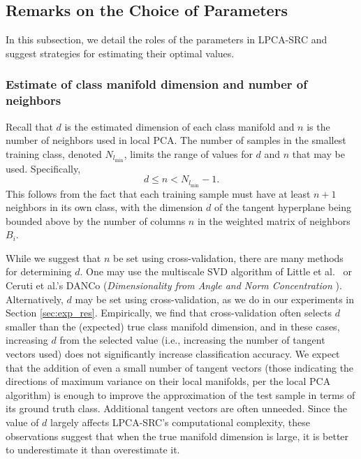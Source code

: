 \documentclass[review]{elsarticle}
\begin{document}
\subsection{Remarks on the Choice of Parameters} \label{sec:pars}

In this subsection, we detail the roles of the parameters in LPCA-SRC and suggest strategies for estimating their optimal values. 

\subsubsection{Estimate of class manifold dimension and number of neighbors} \label{sec:pars_dn}

Recall that $d$ is the estimated dimension of each class manifold and $n$ is the number of neighbors used in local PCA. The number of samples in the smallest training class, denoted $N_{l_\mathrm{min}}$, limits the range of values for $d$ and $n$ that may be used. Specifically, 
\begin{equation} \label{eq:dn_range}
d \leq n < N_{l_\mathrm{min}}-1. 
\end{equation}
This follows from the fact that each training sample must have at least $n+1$ neighbors in its own class, with the dimension $d$ of the tangent hyperplane being bounded above by the number of columns $n$ in the weighted matrix of neighbors $B_i$. 

While we suggest that $n$ be set using cross-validation, there are many methods for determining $d$. One may use the multiscale SVD algorithm of Little et al.\ \cite{mag:msvd} or Ceruti et al.'s DANCo (\emph{Dimensionality from Angle and Norm Concentration} \cite{cer:dan}). Alternatively, $d$ may be set using cross-validation, as we do in our experiments in Section \ref{sec:exp_res}. Empirically, we find that cross-validation often selects $d$ smaller than the (expected) true class manifold dimension, and in these cases, increasing $d$ from the selected value (i.e., increasing the number of tangent vectors used) does not significantly increase classification accuracy. We expect that the addition of even a small number of tangent vectors (those indicating the directions of maximum variance on their local manifolds, per the local PCA algorithm) is enough to improve the approximation of the test sample in terms of its ground truth class. Additional tangent vectors are often unneeded. Since the value of $d$ largely affects LPCA-SRC's computational complexity, these observations suggest that when the true manifold dimension is large, it is better to underestimate it than overestimate it.
\end{document}
